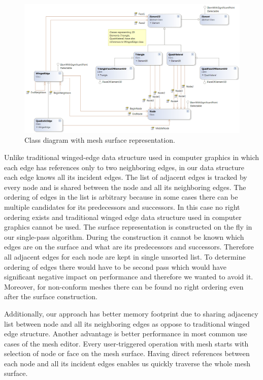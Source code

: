 \begin{figure}[H]
\centering
\includegraphics[width=\textwidth]{figures/chapter-mesh-visualization/figure3}
\decoRule
\caption[Class diagram of surface representation]{Class diagram with mesh surface representation.}
\label{fig:class-diagram-surface}
\end{figure}

Unlike traditional winged-edge data structure used in computer graphics in which each edge has references only to two neighboring edges, in our data structure each edge knows all its incident edges. The list of adjacent edges is tracked by every node and is shared between the node and all its neighboring edges. The ordering of edges in the list is arbitrary because in some cases there can be multiple candidates for its predecessors and successors. In this case no right ordering exists and traditional winged edge data structure used in computer graphics cannot be used. The surface representation is constructed on the fly in our single-pass algorithm. During the construction it cannot be known which edges are on the surface and what are its predecessors and successors. Therefore all adjacent edges for each node are kept in single unsorted list. To determine ordering of edges there would have to be second pass which would have significant negative impact on performance and therefore we wanted to avoid it. Moreover, for non-conform meshes there can be found no right ordering even after the surface construction.

Additionally, our approach has better memory footprint due to sharing adjacency list between node and all its neighboring edges as oppose to traditional winged edge structure. Another advantage is better performance in most common use cases of the mesh editor. Every user-triggered operation with mesh starts with selection of node or face on the mesh surface. Having direct references between each node and all its incident edges enables us quickly traverse the whole mesh surface.

